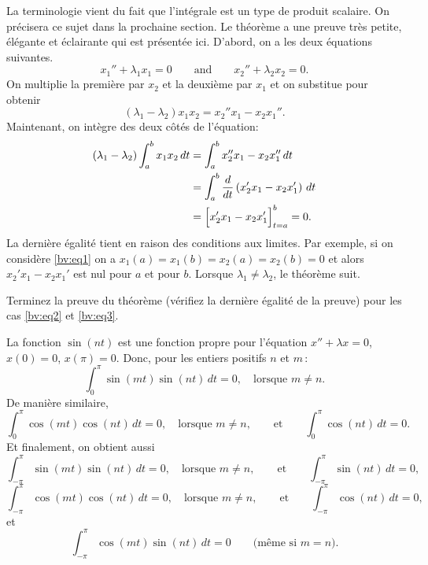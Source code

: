La terminologie vient du fait que l'intégrale est un type de produit scalaire. On précisera ce sujet dans la prochaine section. Le théorème a une preuve  très petite, élégante et éclairante qui est présentée ici.  
D'abord, on a les deux équations suivantes. 
\begin{equation*}
x_1'' + \lambda_1 x_1 = 0
\qquad \text{and} \qquad
x_2'' + \lambda_2 x_2 = 0.
\end{equation*}
On multiplie la première par $x_2$ et la deuxième par $x_1$ et on substitue pour obtenir 
\begin{equation*}
(\lambda_1 - \lambda_2) x_1 x_2 = x_2'' x_1 - x_2 x_1'' .
\end{equation*}
Maintenant, on intègre des deux côtés de l'équation: 
\begin{equation*}
\begin{split}
(\lambda_1 - \lambda_2) \int_a^b x_1 x_2 \,dt
& =
\int_a^b x_2'' x_1 - x_2 x_1'' \,dt \\
& =
\int_a^b \frac{d}{dt} \left( x_2' x_1 - x_2 x_1' \right) \,dt \\
& =
\Bigl[ x_2' x_1 - x_2 x_1' \Bigr]_{t=a}^b
= 0 .
\end{split}
\end{equation*}
La dernière égalité tient en raison des conditions aux limites. Par exemple, si on considère 
 \eqref{bv:eq1} on a  $x_1(a) = x_1(b) = x_2(a) = x_2(b) = 0$
et alors $x_2' x_1 - x_2 x_1'$ est nul pour $a$ et pour $b$.
Lorsque $\lambda_1 \not= \lambda_2$, le théorème suit.

\begin{exercise}[facile]
Terminez la preuve du théorème (vérifiez la dernière égalité de la preuve) pour les cas 
\eqref{bv:eq2} et \eqref{bv:eq3}.
\end{exercise}

La fonction $\sin (n t)$ est une fonction propre pour l'équation 
$x''+\lambda x = 0$, $x(0) = 0$, $x(\pi) = 0$. 
Donc, pour les entiers positifs $n$ et $m$\,:  
\begin{equation*}
\int_{0}^\pi \sin (mt) \sin (nt) \,dt = 0 ,
\quad
\text{lorsque } m \not = n.
\end{equation*}
De manière similaire,
\begin{equation*}
\int_{0}^\pi \cos (mt) \cos (nt) \,dt = 0 ,
\quad
\text{lorsque } m \not = n,
\qquad \text{et} \qquad
\int_{0}^\pi  \cos (nt) \,dt = 0 .
\end{equation*}
Et finalement, on obtient aussi
\begin{equation*}
\int_{-\pi}^\pi \sin (mt) \sin (nt) \,dt = 0 ,
\quad
\text{lorsque } m \not = n, 
\qquad \text{et} \qquad
\int_{-\pi}^\pi  \sin (nt) \,dt = 0 ,
\end{equation*}
\begin{equation*}
\int_{-\pi}^\pi \cos (mt) \cos (nt) \,dt = 0 ,
\quad
\text{lorsque } m \not = n,
\qquad \text{et} \qquad
\int_{-\pi}^\pi  \cos (nt) \,dt = 0 ,
\end{equation*}
et
\begin{equation*}
\int_{-\pi}^\pi \cos (mt) \sin (nt) \,dt = 0 
\qquad \text{(même si $m=n$).}
\end{equation*}

